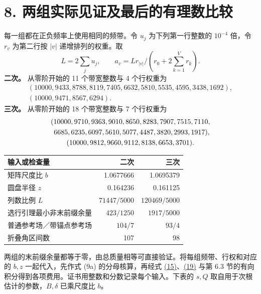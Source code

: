 \documentclass[11pt,a4paper]{article}
\begin{document}
\section{8. 两组实际见证及最后的有理数比较}
每一组都在正负频率上使用相同的频带。令 \(u_j\) 为下列第一行整数的 \(10^{-4}\) 倍，令 \(r_v\) 为第二行按 \(|v|\) 递增排列的权重。取
\[
 L=2\sum_j u_j,\qquad a_v=Lr_{|v|}/(r_0+2{\textstyle\sum_{k=1}^V}r_k).
\]
\textbf{二次。} 从零阶开始的 11 个带宽整数与 4 个行权重为
\[
\begin{gathered}
 (10000,9433,8788,8119,7405,6632,5810,5535,4595,3438,1692),\\
 (10000,9471,8567,6294).
\end{gathered}
\]
\textbf{三次。} 从零阶开始的 18 个带宽整数与 7 个行权重为
\[
\begin{gathered}
 (10000,9710,9363,9010,8650,8283,7907,7515,7110,\\
 \hphantom{(}6685,6235,6097,5610,5077,4487,3820,2993,1917),\\
 (10000,9812,9660,9112,8138,6653,3701).
\end{gathered}
\]
\begin{center}\begin{tabular}{@{}lrr@{}}\toprule
输入或检查量 & 二次 & 三次\\\midrule
矩阵尺度比 \(b\) & 1.0677666 & 1.0695379\\
圆盘半径 \(z\) & 0.164236 & 0.161125\\
列数比例 \(L\) & \(71447/5000\) & \(120469/5000\)\\
选行引理最小非末前缀余量 & \(423/1250\) & \(1917/5000\)\\
普通参考场／带锚点参考场 & \(104/7\) & \(93/4\)\\
折叠角区间数 & 107 & 98\\\bottomrule
\end{tabular}\end{center}
两组的末前缀余量都等于零，由总质量相等可直接验证。将每组频带、行权和对应的 \(b,z\) 一起代入，先作式 (9a) 的分母核算，再经式 \hyperref[eq:15]{(15)}、\hyperref[eq:19]{(19)} 与第 6.3 节的有向积分得到各项费用。证书用整数和分数记录每个输入。下表的 \(s,Q\) 取自用于次根估计的参数，\(B,\delta\) 已乘尺度比 \(b\)。
\end{document}
